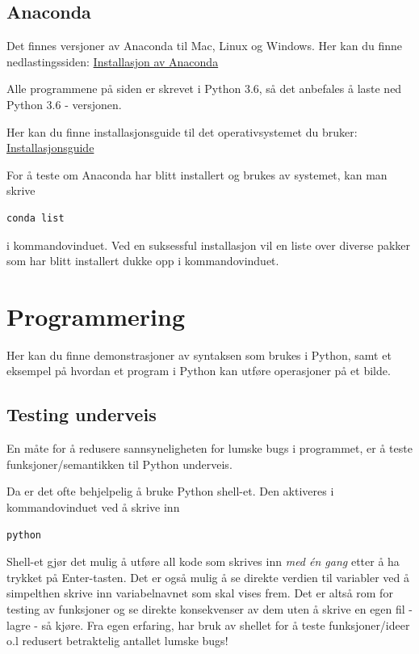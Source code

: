 \documentclass[%
oneside,                 %
final,                   %
10pt,norsk]{article}
\begin{document}
\subsection{Anaconda}
Det finnes versjoner av Anaconda til Mac, Linux og Windows. Her kan du finne nedlastingssiden: \href{{https://www.anaconda.com/download/#linux}}{Installasjon av Anaconda}

Alle programmene på siden er skrevet i Python 3.6, så det anbefales å laste ned Python 3.6 - versjonen.

Her kan du finne installasjonsguide til det operativsystemet du bruker: \href{{https://docs.anaconda.com/anaconda/install/}}{Installasjonsguide}

For å teste om Anaconda har blitt installert og brukes av systemet, kan man skrive
\begin{verbatim}
conda list
\end{verbatim}
i kommandovinduet.
Ved en suksessful installasjon vil en liste over diverse pakker som har blitt installert dukke opp i kommandovinduet.

\section{Programmering}
Her kan du finne demonstrasjoner av syntaksen som brukes i Python, samt et eksempel på hvordan et program i Python kan utføre operasjoner på et bilde.

\subsection{Testing underveis}
En måte for å redusere sannsyneligheten for lumske bugs i programmet, er å teste funksjoner/semantikken til Python underveis.

Da er det ofte behjelpelig å bruke Python shell-et. Den aktiveres i kommandovinduet ved å skrive inn
\begin{verbatim}
python
\end{verbatim}

Shell-et gjør det mulig å utføre all kode som skrives inn \emph{med én gang} etter å ha trykket på Enter-tasten. Det er også mulig å se direkte verdien til variabler ved å simpelthen skrive inn variabelnavnet som skal vises frem.
Det er altså rom for testing av funksjoner og se direkte konsekvenser av dem uten å skrive en egen fil - lagre - så kjøre. Fra egen erfaring, har bruk av shellet for å teste funksjoner/ideer o.l redusert betraktelig antallet lumske bugs!
\end{document}

